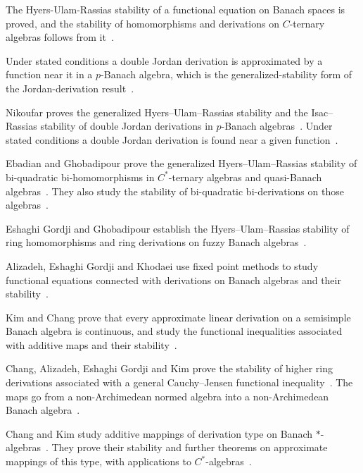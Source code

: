 The Hyers-Ulam-Rassias stability of a functional equation on Banach spaces is
proved, and the stability of homomorphisms and derivations on $C$-ternary
algebras follows from it~\cite{WlStabilityOfHomomorphismsAndDer2019}.

Under stated conditions a double Jordan derivation is approximated by a
function near it in a $p$-Banach algebra, which is the generalized-stability
form of the Jordan-derivation
result~\cite{WlFunctionsNearSomeDoubleJordanD2019}.

Nikoufar proves the generalized Hyers--Ulam--Rassias stability and the
Isac--Rassias stability of double Jordan derivations in $p$-Banach algebras~\cite{WlFunctionsNearSomeAlpha1Alpha2D2017}.
Under stated conditions a double Jordan derivation is found near a given
function~\cite{WlFunctionsNearSomeAlpha1Alpha2D2017}.

Ebadian and Ghobadipour prove the generalized Hyers--Ulam--Rassias stability
of bi-quadratic bi-homomorphisms in $C^*$-ternary algebras and quasi-Banach
algebras~\cite{WlOnApproximateBiQuadraticBiHomo2012}. They also study the stability of bi-quadratic bi-derivations on those
algebras~\cite{WlOnApproximateBiQuadraticBiHomo2012}.

Eshaghi Gordji and Ghobadipour establish the Hyers--Ulam--Rassias stability of
ring homomorphisms and ring derivations on fuzzy Banach
algebras~\cite{WlFuzzyStabilityOfRingHomomorphi2009}.

Alizadeh, Eshaghi Gordji and Khodaei use fixed point methods to study
functional equations connected with derivations on Banach algebras and their
stability~\cite{WlFixedPointsAndFunctionalEquati2012}.

Kim and Chang prove that every approximate linear derivation on a semisimple
Banach algebra is continuous, and study the functional inequalities associated
with additive maps and their
stability~\cite{WlApproximateLinearDerivationsAn2012}.

Chang, Alizadeh, Eshaghi Gordji and Kim prove the stability of higher ring
derivations associated with a general Cauchy--Jensen functional inequality~\cite{WlApproximateHigherRingDerivatio2015}.
The maps go from a non-Archimedean normed algebra into a non-Archimedean Banach
algebra~\cite{WlApproximateHigherRingDerivatio2015}.

Chang and Kim study additive mappings of derivation type on Banach
$*$-algebras~\cite{WlApproximateAdditiveMappingsOfD2022}. They prove their stability and further theorems on approximate
mappings of this type, with applications to
$C^*$-algebras~\cite{WlApproximateAdditiveMappingsOfD2022}.

